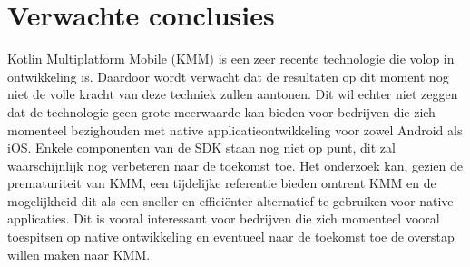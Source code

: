 \section{Verwachte conclusies}
\label{sec:verwachte_conclusies}

Kotlin Multiplatform Mobile (KMM) is een zeer recente technologie die volop in ontwikkeling is. Daardoor wordt verwacht dat de resultaten op dit moment nog niet de volle kracht van deze techniek zullen aantonen. Dit wil echter niet zeggen dat de technologie geen grote meerwaarde kan bieden voor bedrijven die zich momenteel bezighouden met native applicatieontwikkeling voor zowel Android als iOS. Enkele componenten van de SDK staan nog niet op punt, dit zal waarschijnlijk nog verbeteren naar de toekomst toe. Het onderzoek kan, gezien de prematuriteit van KMM, een tijdelijke referentie bieden omtrent KMM en de mogelijkheid dit als een sneller en efficiënter alternatief te gebruiken voor native applicaties. Dit is vooral interessant voor bedrijven die zich momenteel vooral toespitsen op native ontwikkeling en eventueel naar de toekomst toe de overstap willen maken naar KMM. 


